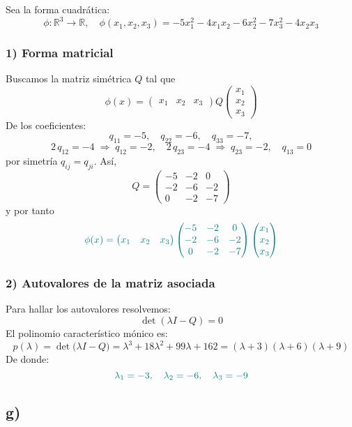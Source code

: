 \documentclass{article}
\begin{document}
Sea la forma cuadrática:
\[
\phi:\mathbb{R}^3\to\mathbb{R},
\quad
\phi(x_1,x_2,x_3) = -5x_1^2 - 4x_1x_2 - 6x_2^2 - 7x_3^2 - 4x_2x_3
\]

\subsubsection*{1) Forma matricial}

Buscamos la matriz simétrica \(Q\) tal que
\[
\phi(x)=
\begin{pmatrix}
x_1 & x_2 & x_3
\end{pmatrix}
Q
\begin{pmatrix}
x_1\\
x_2\\
x_3
\end{pmatrix}
\]
De los coeficientes:
\[
q_{11}=-5,\quad
q_{22}=-6,\quad
q_{33}=-7,
\]
\[
2\,q_{12}=-4\;\Longrightarrow\;q_{12}=-2,
\quad
2\,q_{23}=-4\;\Longrightarrow\;q_{23}=-2,
\quad
q_{13}=0
\]
por simetría \(q_{ij}=q_{ji}\). Así,
\[
Q =
\begin{pmatrix}
-5 & -2 & 0\\[4pt]
-2 & -6 & -2\\[4pt]
0  & -2 & -7
\end{pmatrix}
\]
y por tanto
\[
\color{teal}
\phi(x)=
\begin{pmatrix}
x_1 & x_2 & x_3
\end{pmatrix}
\begin{pmatrix}
-5 & -2 & 0\\
-2 & -6 & -2\\
0  & -2 & -7
\end{pmatrix}
\begin{pmatrix}
x_1\\
x_2\\
x_3
\end{pmatrix}
\]

\subsubsection*{2) Autovalores de la matriz asociada}

Para hallar los autovalores resolvemos:
\[
\det(\lambda I - Q) = 0
\]
El polinomio característico mónico es:
\[
p(\lambda)
= \det\!\bigl(\lambda I - Q\bigr)
= \lambda^3 + 18\lambda^2 + 99\lambda + 162
= (\lambda + 3)(\lambda + 6)(\lambda + 9)
\]
De donde:
\[
\color{teal}
\lambda_1 = -3,
\quad
\lambda_2 = -6,
\quad
\lambda_3 = -9
\]


\subsection*{g)}
\end{document}
